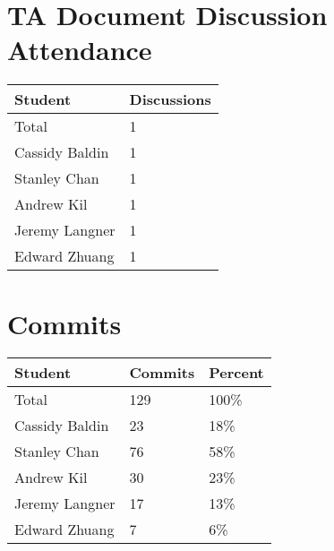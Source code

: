 \documentclass{article}
\begin{document}
\section{TA Document Discussion Attendance}


\begin{table}[H]
\centering
\begin{tabular}{ll}
\toprule
\textbf{Student} & \textbf{Discussions}\\
\midrule
Total & 1\\
Cassidy Baldin & 1\\
Stanley Chan & 1\\
Andrew Kil & 1\\
Jeremy Langner & 1\\
Edward Zhuang & 1\\
\bottomrule
\end{tabular}
\end{table}

\section{Commits}


\begin{table}[H]
\centering
\begin{tabular}{lll}
\toprule
\textbf{Student} & \textbf{Commits} & \textbf{Percent}\\
\midrule
Total & 129 & 100\% \\
Cassidy Baldin & 23 & 18\% \\
Stanley Chan & 76 & 58\% \\
Andrew Kil & 30 & 23\% \\
Jeremy Langner & 17 & 13\% \\
Edward Zhuang & 7 & 6\% \\
\bottomrule
\end{tabular}
\end{table}

\end{document}
